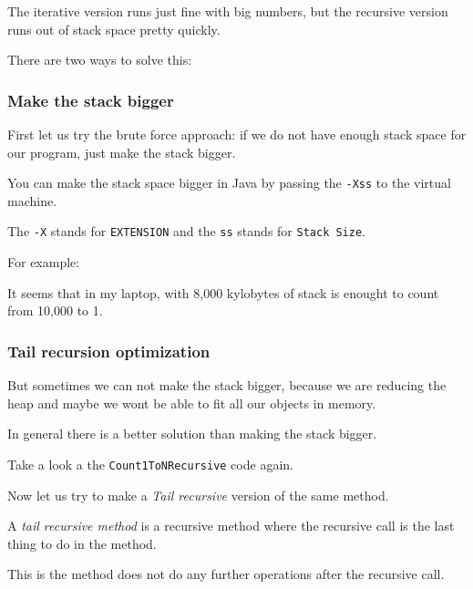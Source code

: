 \documentclass[a4paper, 9pt]{extarticle}
\begin{document}
The iterative version runs just fine with big numbers, but the recursive
version runs out of stack space pretty quickly.

There are two ways to solve this:

\subsubsection{Make the stack bigger}

First let us try the brute force approach: if we do not have enough stack space
for our program, just make the stack bigger.

You can make the stack space bigger in Java by passing the \texttt{-Xss} to the virtual machine.

The \texttt{-X} stands for \texttt{EXTENSION} and the \texttt{ss} stands for \texttt{Stack Size}.

For example:


It seems that in my laptop, with 8,000 kylobytes of stack is enought to count from 10,000 to 1.



\subsubsection{Tail recursion optimization}

But sometimes we can not make the stack bigger, because we are reducing the
heap and maybe we wont be able to fit all our objects in memory.

In general there is a better solution than making the stack bigger.

Take a look a the \texttt{Count1ToNRecursive} code again.


Now let us try to make a \emph{Tail recursive} version of the same method.

A \emph{tail recursive method} is a recursive method where the recursive call
is the last thing to do in the method.

This is the method does not do any further operations after the recursive call.

\begin{multicols}{2}
\columnbreak
{}
\end{multicols}
\end{document}

